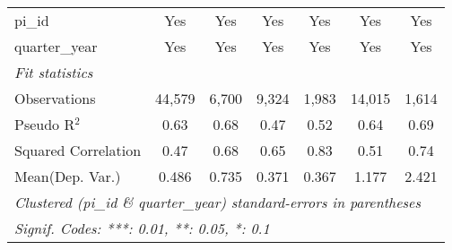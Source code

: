 \begin{tabular}{lcccccc}
   pi\_id                                                     & Yes           & Yes            & Yes           & Yes           & Yes           & Yes\\  
   quarter\_year                                              & Yes           & Yes            & Yes           & Yes           & Yes           & Yes\\  
   \midrule
   \emph{Fit statistics}\\
   Observations                                               & 44,579        & 6,700          & 9,324         & 1,983         & 14,015        & 1,614\\  
   Pseudo R$^2$                                               & 0.63          & 0.68           & 0.47          & 0.52          & 0.64          & 0.69\\  
   Squared Correlation                                        & 0.47          & 0.68           & 0.65          & 0.83          & 0.51          & 0.74\\  
Mean(Dep. Var.) & 0.486 & 0.735 & 0.371 & 0.367 & 1.177 & 2.421 \\
   \midrule \midrule
   \multicolumn{7}{l}{\emph{Clustered (pi\_id \& quarter\_year) standard-errors in parentheses}}\\
   \multicolumn{7}{l}{\emph{Signif. Codes: ***: 0.01, **: 0.05, *: 0.1}}\\
\end{tabular}
\par\endgroup
